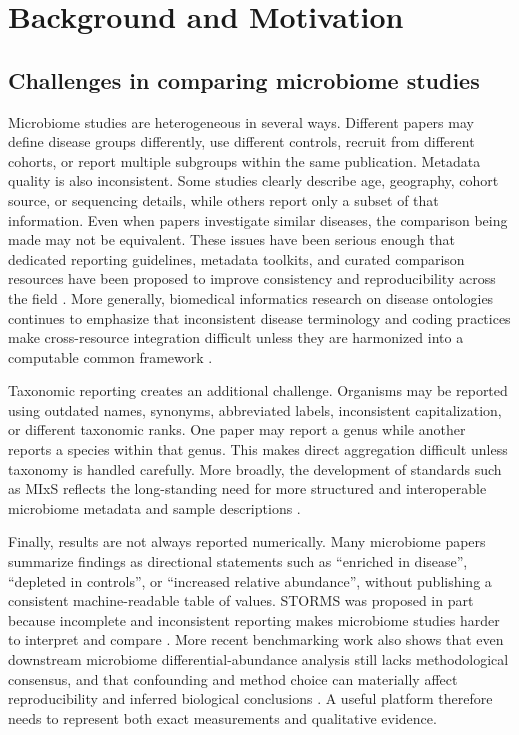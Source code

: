 \section{Background and Motivation}

\subsection{Challenges in comparing microbiome studies}

Microbiome studies are heterogeneous in several ways. Different papers may define disease groups differently, use different controls, recruit from different cohorts, or report multiple subgroups within the same publication. Metadata quality is also inconsistent. Some studies clearly describe age, geography, cohort source, or sequencing details, while others report only a subset of that information. Even when papers investigate similar diseases, the comparison being made may not be equivalent. These issues have been serious enough that dedicated reporting guidelines, metadata toolkits, and curated comparison resources have been proposed to improve consistency and reproducibility across the field \citep{mirzayi2021storms,geistlinger2024bugsigdb,zass2024toolkit}. More generally, biomedical informatics research on disease ontologies continues to emphasize that inconsistent disease terminology and coding practices make cross-resource integration difficult unless they are harmonized into a computable common framework \citep{vasilevsky2025mondo}.

Taxonomic reporting creates an additional challenge. Organisms may be reported using outdated names, synonyms, abbreviated labels, inconsistent capitalization, or different taxonomic ranks. One paper may report a genus while another reports a species within that genus. This makes direct aggregation difficult unless taxonomy is handled carefully. More broadly, the development of standards such as MIxS reflects the long-standing need for more structured and interoperable microbiome metadata and sample descriptions \citep{yilmaz2011mixs}.

Finally, results are not always reported numerically. Many microbiome papers summarize findings as directional statements such as ``enriched in disease'', ``depleted in controls'', or ``increased relative abundance'', without publishing a consistent machine-readable table of values. STORMS was proposed in part because incomplete and inconsistent reporting makes microbiome studies harder to interpret and compare \citep{mirzayi2021storms}. More recent benchmarking work also shows that even downstream microbiome differential-abundance analysis still lacks methodological consensus, and that confounding and method choice can materially affect reproducibility and inferred biological conclusions \citep{wirbel2024benchmark,pelto2025elementary}. A useful platform therefore needs to represent both exact measurements and qualitative evidence.

